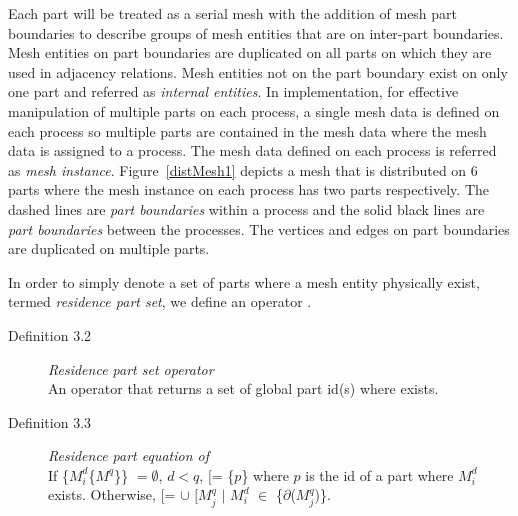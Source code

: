 Each part will be treated as a serial mesh with the addition of mesh
part boundaries to describe groups of mesh entities that are on inter-part boundaries. Mesh entities on part boundaries are
duplicated on all parts on which they are used in adjacency relations. Mesh entities not on the part boundary exist on only one part and referred as \emph{internal entities}. In implementation, for effective manipulation of multiple parts on each process, a single mesh data is defined on each process so multiple parts are contained in the mesh data where the mesh data is assigned to a process. The mesh data defined on each process is referred as \emph{mesh instance}. Figure~\ref{distMesh1} depicts a mesh that is distributed on 6 parts where the mesh instance on each process has two parts respectively. The dashed lines are \emph{part boundaries} within a process and the solid black lines are \emph{part boundaries} between the processes. The vertices and edges on part boundaries are duplicated on multiple parts.

In order to simply denote a set of parts where a mesh entity physically exist, termed \emph{residence part set}, we define an operator {\RP}. 

\begin{description}
\item[Definition 3.2] \emph{Residence part set operator \RP\Ls\Mdi\Rs} \\
An operator that returns a set of global part id(s) where \Mdib exists. 
\end{description}


\begin{description}
\item[Definition 3.3] \emph{Residence part equation of \Mdi} \\
If \{$M^d_i$\{$M^q$\}\} $= \emptyset$, $d<q$, \RP$[$\Mdi\Rs\blk = \{$p$\} where $p$
is the id of a part where $M^d_i$ exists. Otherwise, \RP$[$\Mdi\Rs\blk = $\cup$ \RP$[$$M^q_j$ $\mid$ $M^d_i$ $\in$
\{$\partial$($M^q_j$)\}\Rs. %
\end{description}


